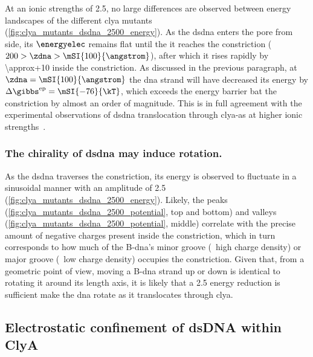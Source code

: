 At an ionic strengths of \SI{2.5}{\Molar}, no large differences are observed between energy landscapes of the
different \gls{clya} mutants (\cref{fig:clya_mutants_dsdna_2500_energy}). As the \gls{dsdna} enters the pore
from \cisi{} side, its $\energyelec$ remains flat until the it reaches the constriction ($200 > \zdna >
\mSI{100}{\angstrom}$), after which it rises rapidly by \SI{\approx+10}{\kT} inside the constriction. As
discussed in the previous paragraph, at $\zdna = \mSI{100}{\angstrom}$ the \gls{dna} strand will have
decreased its energy by $\Delta \gibbs^{\textrm{ep}} = \mSI{-76}{\kT}$, which exceeds the energy barrier bat
the constriction by almost an order of magnitude. This is in full agreement with the experimental observations
of \gls{dsdna} translocation through \gls{clya-as} at higher ionic
strengths~\cite{Franceschini-2013,Franceschini-2016}.

\subsubsection{The chirality of \gls{dsdna} may induce rotation.}
%

As the \gls{dsdna} traverses the constriction, its energy is observed to fluctuate in a sinusoidal manner with an
amplitude of \SI{2.5}{\kT} (\cref{fig:clya_mutants_dsdna_2500_energy}). Likely, the peaks
(\cref{fig:clya_mutants_dsdna_2500_potential}, top and bottom) and valleys
(\cref{fig:clya_mutants_dsdna_2500_potential}, middle) correlate with the precise amount of negative charges
present inside the constriction, which in turn corresponds to how much of the B-\gls{dna}'s minor groove
(\ie~high charge density) or major groove (\ie~low charge density) occupies the constriction. Given that, from
a geometric point of view, moving a B-\gls{dna} strand up or down is identical to rotating it around its
length axis, it is likely that a \SI{2.5}{\kT} energy reduction is sufficient make the \gls{dna} rotate as it
translocates through \gls{clya}.


\subsection{Electrostatic confinement of {dsDNA} within {ClyA}}
%


